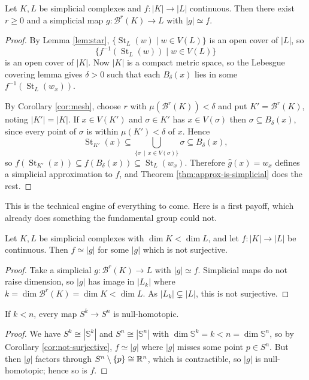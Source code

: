 \documentclass[a4paper]{scrartcl}
\newcommand{\St}{\operatorname{St}}
\newcommand{\bary}{\mathcal{B}}
\newcommand{\sS}{\mathbb{S}}
\begin{document}
\begin{theorem} \label{thm:sat}
	Let $K, L$ be simplicial complexes and $f: |K| \to |L|$ continuous. Then there exist $r \geq 0$ and a simplicial map $g: \bary^r(K) \to L$ with $|g| \simeq f$.
\end{theorem}
\begin{proof}
	By Lemma \ref{lem:star}, $\{\St_L(w) \mid w \in V(L)\}$ is an open cover of $|L|$, so
	$$
	\{f^{-1}(\St_L(w)) \mid w \in V(L)\}
	$$
	is an open cover of $|K|$. Now $|K|$ is a compact metric space, so the Lebesgue covering lemma gives $\delta > 0$ such that each $B_\delta(x)$ lies in some $f^{-1}(\St_L(w_x))$.

	By Corollary \ref{cor:mesh}, choose $r$ with $\mu(\bary^r(K)) < \delta$ and put $K' = \bary^r(K)$, noting $|K'| = |K|$. If $x \in V(K')$ and $\sigma \in K'$ has $x \in V(\sigma)$ then $\sigma \subseteq B_\delta(x)$, since every point of $\sigma$ is within $\mu(K') < \delta$ of $x$. Hence
	$$
	\St_{K'}(x) \subseteq \bigcup_{\{\sigma \,\mid\, x \in V(\sigma)\}}\sigma \subseteq B_\delta(x),
	$$
	so $f(\St_{K'}(x)) \subseteq f(B_\delta(x)) \subseteq \St_L(w_x)$. Therefore $\hat g(x) = w_x$ defines a simplicial approximation to $f$, and Theorem \ref{thm:approx-is-simplicial} does the rest.
\end{proof}

This is the technical engine of everything to come. Here is a first payoff, which already
does something the fundamental group could not.

\begin{corollary} \label{cor:not-surjective}
	Let $K, L$ be simplicial complexes with $\dim K < \dim L$, and let $f: |K|\to|L|$ be continuous. Then $f \simeq |g|$ for some $|g|$ which is not surjective.
\end{corollary}
\begin{proof}
	Take a simplicial $g: \bary^r(K)\to L$ with $|g|\simeq f$. Simplicial maps do not raise dimension, so $|g|$ has image in $|L_k|$ where $k = \dim\bary^r(K) = \dim K < \dim L$. As $|L_k| \subsetneq |L|$, this is not surjective.
\end{proof}

\begin{theorem} \label{thm:sk-to-sn}
	If $k < n$, every map $S^k \to S^n$ is null-homotopic.
\end{theorem}
\begin{proof}
	We have $S^k \cong |\sS^k|$ and $S^n \cong |\sS^n|$ with $\dim \sS^k = k < n = \dim\sS^n$, so by Corollary \ref{cor:not-surjective}, $f \simeq |g|$ where $|g|$ misses some point $p \in S^n$. But then $|g|$ factors through $S^n\setminus\{p\}\cong\mathbb{R}^n$, which is contractible, so $|g|$ is null-homotopic; hence so is $f$.
\end{proof}
\end{document}
